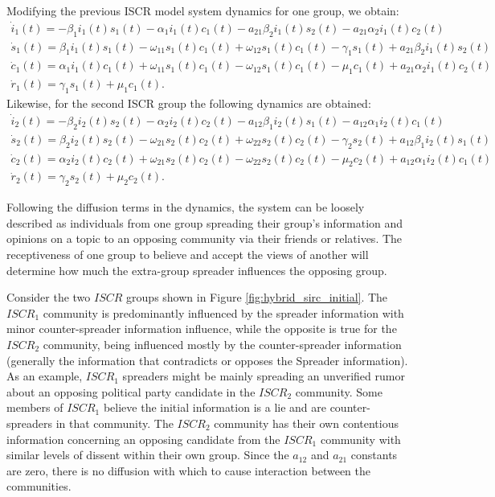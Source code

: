 \noindent Modifying the previous ISCR model system dynamics for one group, we obtain:
\begin{equation}\label{eqn:SIRC1_dynamics}
\left.\begin{aligned}
\dot{i}_1(t) = -\beta_1 i_1(t)s_1(t) - \alpha_1 i_1(t)c_1(t) - a_{21} \beta_2 i_1(t)s_2(t) - a_{21} \alpha_2 i_1(t)c_2(t)\\
\dot{s}_1(t) = \beta_1 i_1(t)s_1(t) - \omega_{11} s_1(t)c_1(t) + \omega_{12} s_1(t)c_1(t) - \gamma_1 s_1(t) + a_{21} \beta_2 i_1(t)s_2(t)\\
\dot{c}_1(t) = \alpha_1 i_1(t)c_1(t) + \omega_{11} s_1(t)c_1(t) - \omega_{12} s_1(t)c_1(t) - \mu_1 c_1(t) + a_{21} \alpha_2 i_1(t)c_2(t)\\
\dot{r}_1(t) = \gamma_1 s_1(t) + \mu_1 c_1(t).
\end{aligned}\right.
\end{equation}
\noindent Likewise, for the second ISCR group the following dynamics are obtained:\begin{equation}\label{eqn:SIRC2_dynamics}
\left.\begin{aligned}
\dot{i}_2(t) = -\beta_2 i_2(t)s_2(t) - \alpha_2 i_2(t)c_2(t) - a_{12} \beta_1 i_2(t)s_1(t) - a_{12} \alpha_1 i_2(t)c_1(t)\\
\dot{s}_2(t) = \beta_2 i_2(t)s_2(t) - \omega_{21} s_2(t)c_2(t) + \omega_{22} s_2(t)c_2(t) - \gamma_2 s_2(t) + a_{12} \beta_1 i_2(t)s_1(t)\\
\dot{c}_2(t) = \alpha_2 i_2(t)c_2(t) + \omega_{21} s_2(t)c_2(t) - \omega_{22} s_2(t)c_2(t) - \mu_2 c_2(t) + a_{12} \alpha_1 i_2(t)c_1(t)\\
\dot{r}_2(t) = \gamma_2 s_2(t) + \mu_2 c_2(t).
\end{aligned}\right.
\end{equation}

Following the diffusion terms in the dynamics, the system can be loosely described as individuals from one group spreading their group's information and opinions on a topic to an opposing community via their friends or relatives. The receptiveness of one group to believe and accept the views of another will determine how much the extra-group spreader influences the opposing group.

Consider the two $ISCR$ groups shown in Figure \ref{fig:hybrid_sirc_initial}. The $ISCR_1$ community is predominantly influenced by the spreader information with minor counter-spreader information influence, while the opposite is true for the $ISCR_2$ community, being influenced mostly by the counter-spreader information (generally the information that contradicts or opposes the Spreader information). As an example, $ISCR_1$ spreaders might be mainly spreading an unverified rumor about an opposing political party candidate in the $ISCR_2$ community. Some members of $ISCR_1$ believe the initial information is a lie and are counter-spreaders in that community. The $ISCR_2$ community has their own contentious information concerning an opposing candidate from the $ISCR_1$ community with similar levels of dissent within their own group. Since the  $a_{12}$ and $a_{21}$ constants are zero, there is no diffusion with which to cause interaction between the communities. 

